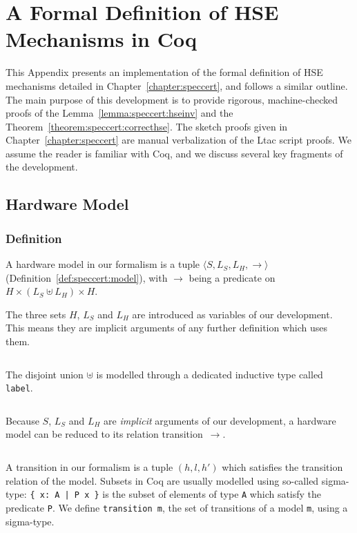 \chapter{A Formal Definition of HSE Mechanisms in Coq}
\label{appendix:speccert}

This Appendix presents an implementation of the formal definition of HSE
mechanisms detailed in Chapter~\ref{chapter:speccert}, and follows a similar
outline.
%
The main purpose of this development is to provide rigorous, machine-checked
proofs of the Lemma~\ref{lemma:speccert:hseinv} and the
Theorem~\ref{theorem:speccert:correcthse}.
%
The sketch proofs given in Chapter~\ref{chapter:speccert} are manual
verbalization of the {\textsc Ltac} script proofs.
%
We assume the reader is familiar with Coq, and we discuss several key fragments
of the development.

\section{Hardware Model}

\subsection{Definition}

A hardware model in our formalism is a tuple
$\langle S, L_S, L_H, \rightarrow \rangle$
(Definition~\ref{def:speccert:model}), with $\rightarrow$ being a predicate on
$H \times (L_S \uplus L_H) \times H$.

The three sets $H$, $L_S$ and $L_H$ are introduced as variables of our
development.
%
This means they are implicit arguments of any further definition which uses
them.

\inputminted[gobble=2,firstline=2,lastline=2]{coq}{Listings/SpecCert.v}

The disjoint union $\uplus$ is modelled through a dedicated inductive type
called \texttt{label}.

\inputminted[gobble=2,firstline=4,lastline=8]{coq}{Listings/SpecCert.v}

Because $S$, $L_S$ and $L_H$ are \emph{implicit} arguments of our development, a
hardware model can be reduced to its relation transition~$\rightarrow$.

\inputminted[gobble=2,firstline=10,lastline=12]{coq}{Listings/SpecCert.v}

A transition in our formalism is a tuple $(h, l, h')$ which satisfies the
transition relation of the model.
%
Subsets in Coq are usually modelled using so-called sigma-type:
%
\texttt{\{ x: A | P x \}} is the subset of elements of type \texttt{A} which
satisfy the predicate \texttt{P}.
%
We define \texttt{transition m}, the set of transitions of a model \texttt{m},
using a sigma-type.

